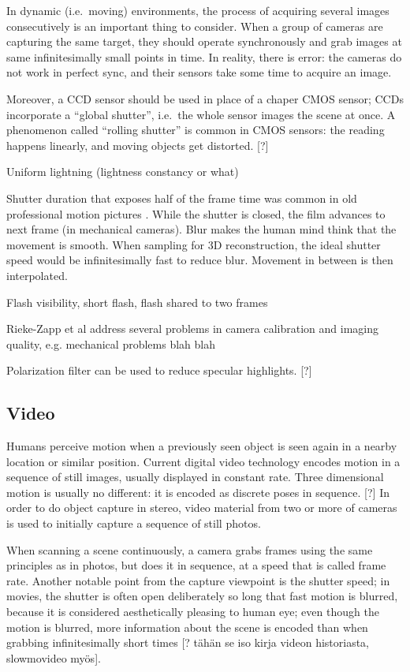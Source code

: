 In dynamic (i.e.~moving) environments, the process of acquiring several images consecutively is an important thing to consider.
When a group of cameras are capturing the same target, they should operate synchronously and grab images at same infinitesimally small points in time.
In reality, there is error: the cameras do not work in perfect sync, and their sensors take some time to acquire an image.

Moreover, a CCD sensor should be used in place of a chaper CMOS sensor; CCDs incorporate a ``global shutter'', i.e.~the whole sensor images the scene at once.
A phenomenon called ``rolling shutter'' is common in CMOS sensors: the reading happens linearly, and moving objects get distorted. [?]

Uniform lightning (lightness constancy or what)

Shutter duration that exposes half of the frame time was common in old professional motion pictures \cite{wilson2004anton}.
While the shutter is closed, the film advances to next frame (in mechanical cameras).
Blur makes the human mind think that the movement is smooth.
When sampling for 3D reconstruction, the ideal shutter speed would be infinitesimally fast to reduce blur.
Movement in between is then interpolated.

Flash visibility, short flash, flash shared to two frames

Rieke-Zapp et al \cite{rieke2009evaluation} address several problems in camera calibration and imaging quality, e.g. mechanical problems blah blah

Polarization filter can be used to reduce specular highlights. [?] 

\subsection{Video}

Humans perceive motion when a previously seen object is seen again in a nearby location or similar position. Current digital video technology encodes motion in a sequence of still images, usually displayed in constant rate. Three dimensional motion is usually no different: it is encoded as discrete poses in sequence. [?] In order to do object capture in stereo, video material from two or more of cameras is used to initially capture a sequence of still photos.

When scanning a scene continuously, a camera grabs frames using the same principles as in photos, but does it in sequence, at a speed that is called frame rate. Another notable point from the capture viewpoint is the shutter speed; in movies, the shutter is often open deliberately so long that fast motion is blurred, because it is considered aesthetically pleasing to human eye; even though the motion is blurred, more information about the scene is encoded than when grabbing infinitesimally short times [? tähän se iso kirja videon historiasta, slowmovideo myös].

